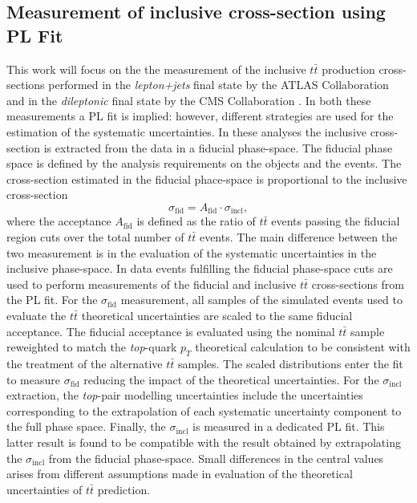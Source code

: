 \documentclass[12pt]{article}
\begin{document}
\subsection{Measurement of inclusive cross-section using PL Fit}
This work will focus on the the measurement of the inclusive $t\bar{t}$ production cross-sections performed in the \emph{lepton+jets} final state by the ATLAS Collaboration \cite{Aad_2020} and in the \emph{dileptonic} final state by the CMS Collaboration \cite{CMS_inclusive}. In both these measurements a PL fit is implied: however, different strategies are used for the estimation of the systematic uncertainties. 
In these analyses the inclusive cross-section is extracted from the data in a fiducial phase-space. The fiducial phase space is defined by the analysis requirements on the objects and the events. The cross-section estimated in the fiducial phace-space is proportional to the inclusive cross-section
\begin{equation}
\sigma_{\mathrm{fid}} = A_{\mathrm{fid}} \cdot \sigma_{\mathrm{incl}}, 
\end{equation}
where the acceptance $A_{\mathrm{fid}}$ is defined as the ratio of $t\bar{t}$ events passing the fiducial region cuts over the total number of $t\bar{t}$ events.
The main difference between the two measurement is in the evaluation of the systematic uncertainties in the inclusive phase-space. 
In \cite{Aad_2020} data events fulfilling the fiducial phase-space cuts are used to perform measurements of the fiducial and inclusive $t\bar{t}$ cross-sections from the PL fit. For the $\sigma_{\mathrm{fid}}$ measurement, all samples of the simulated events used to evaluate the $t\bar{t}$ theoretical uncertainties are scaled to the same fiducial acceptance. 
The fiducial acceptance is evaluated using the nominal $t\bar{t}$ sample reweighted to match the \emph{top}-quark $p_T$ theoretical calculation to be consistent with the treatment of the alternative $t\bar{t}$ samples. The scaled distributions enter the fit to measure $\sigma_{\mathrm{fid}}$ reducing the impact of the theoretical uncertainties. For the $\sigma_{\mathrm{incl}}$ extraction, the \emph{top}-pair modelling uncertainties include the uncertainties corresponding to the extrapolation of each systematic uncertainty component to the full phase space. 
Finally, the $\sigma_{\mathrm{incl}}$ is measured in a dedicated PL fit. This latter result is found to be compatible with the result obtained by extrapolating the $\sigma_{\mathrm{incl}}$ from the fiducial phase-space. Small differences in the central values arises from different assumptions made in evaluation of the theoretical uncertainties of $t\bar{t}$ prediction.
\end{document}
